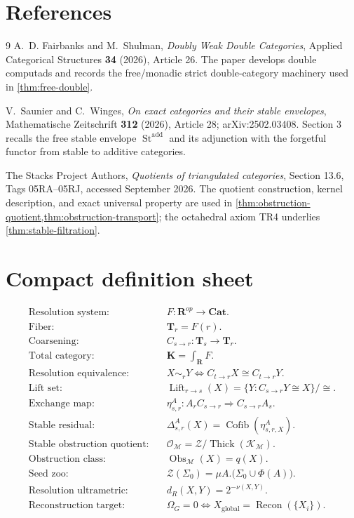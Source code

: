 \documentclass[11pt]{article}
\theoremstyle{definition}
\theoremstyle{remark}
\newcommand{\K}{\mathbf K}
\newcommand{\Rcat}{\mathbf R}
\newcommand{\Tcat}{\mathbf T}
\newcommand{\Cat}{\mathbf{Cat}}
\newcommand{\Lift}{\operatorname{Lift}}
\newcommand{\Cofib}{\operatorname{Cofib}}
\newcommand{\Recon}{\operatorname{Recon}}
\newcommand{\Obs}{\operatorname{Obs}}
\newcommand{\Zoo}{\mathcal Z}
\newcommand{\Seeds}{\Sigma}
\begin{document}
\section*{References}
\begin{thebibliography}{9}
A.~D. Fairbanks and M.~Shulman,
\emph{Doubly Weak Double Categories},
Applied Categorical Structures \textbf{34} (2026), Article 26.
The paper develops double computads and records the free/monadic strict double-category machinery used in \cref{thm:free-double}.

V.~Saunier and C.~Winges,
\emph{On exact categories and their stable envelopes},
Mathematische Zeitschrift \textbf{312} (2026), Article 28; arXiv:2502.03408.
Section 3 recalls the free stable envelope $\operatorname{St}^{\mathrm{add}}$ and its adjunction with the forgetful functor from stable to additive categories.

The Stacks Project Authors,
\emph{Quotients of triangulated categories}, Section 13.6, Tags 05RA--05RJ, accessed September 2026.
The quotient construction, kernel description, and exact universal property are used in \cref{thm:obstruction-quotient,thm:obstruction-transport}; the octahedral axiom TR4 underlies \cref{thm:stable-filtration}.
\end{thebibliography}

\appendix
\section{Compact definition sheet}

\begin{align*}
\text{Resolution system:}\quad
&F:\Rcat^{op}\to\Cat.\\[0.4em]
\text{Fiber:}\quad
&\Tcat_r=F(r).\\[0.4em]
\text{Coarsening:}\quad
&C_{s\to r}:\Tcat_s\to\Tcat_r.\\[0.4em]
\text{Total category:}\quad
&\K=\int_{\Rcat}F.\\[0.4em]
\text{Resolution equivalence:}\quad
&X\sim_rY\iff C_{t\to r}X\cong C_{t\to r}Y.\\[0.4em]
\text{Lift set:}\quad
&\Lift_{r\to s}(X)=\{Y:C_{s\to r}Y\cong X\}/\cong.\\[0.4em]
\text{Exchange map:}\quad
&\eta^A_{s,r}:A_rC_{s\to r}\Rightarrow C_{s\to r}A_s.\\[0.4em]
\text{Stable residual:}\quad
&\Delta^A_{s,r}(X)=\Cofib(\eta^A_{s,r,X}).\\[0.4em]
\text{Stable obstruction quotient:}\quad
&\mathcal O_{\mathscr M}=\mathcal Z/\operatorname{Thick}(\mathcal K_{\mathscr M}).\\[0.4em]
\text{Obstruction class:}\quad
&\Obs_{\mathscr M}(X)=q(X).\\[0.4em]
\text{Seed zoo:}\quad
&\Zoo(\Seeds_0)=\mu A.\bigl(\Seeds_0\cup\Phi(A)\bigr).\\[0.4em]
\text{Resolution ultrametric:}\quad
&d_R(X,Y)=2^{-\nu(X,Y)}.\\[0.4em]
\text{Reconstruction target:}\quad
&\Omega_G=0\iff X_{\mathrm{global}}=\Recon(\{X_i\}).
\end{align*}
\end{document}
